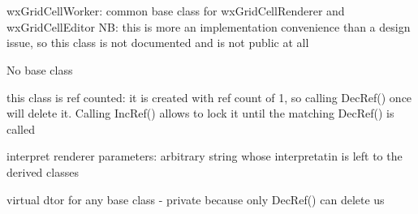 %
%


\section{}\label{wxgridcellworker}



wxGridCellWorker: common base class for wxGridCellRenderer and
wxGridCellEditor
NB: this is more an implementation convenience than a design issue, so this
class is not documented and is not public at all



No base class




\label{wxgridcellworkerwxgridcellworker}



\label{wxgridcellworkerincref}


this class is ref counted: it is created with ref count of 1, so
calling DecRef() once will delete it. Calling IncRef() allows to lock
it until the matching DecRef() is called


\label{wxgridcellworkerdecref}



\label{wxgridcellworkersetparameters}


interpret renderer parameters: arbitrary string whose interpretatin is
left to the derived classes


\label{wxgridcellworkerdtor}


virtual dtor for any base class - private because only DecRef() can
delete us

